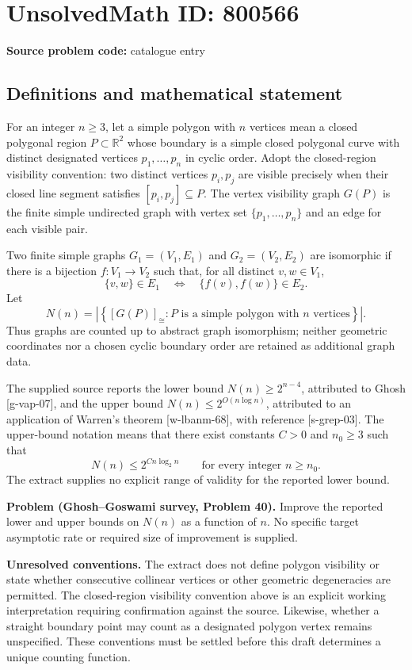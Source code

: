 \documentclass[11pt]{article}
\newcommand{\R}{\mathbb{R}}
\begin{document}
\section*{UnsolvedMath ID: 800566}
\textbf{Source problem code:} catalogue entry
\subsection{Definitions and mathematical statement}
For an integer \(n\geq 3\), let a simple polygon with \(n\) vertices mean a closed polygonal region \(P\subset\R^2\) whose boundary is a simple closed polygonal curve with distinct designated vertices \(p_1,\ldots,p_n\) in cyclic order. Adopt the closed-region visibility convention: two distinct vertices \(p_i,p_j\) are visible precisely when their closed line segment satisfies \([p_i,p_j]\subseteq P\). The vertex visibility graph \(G(P)\) is the finite simple undirected graph with vertex set \(\{p_1,\ldots,p_n\}\) and an edge for each visible pair.

Two finite simple graphs \(G_1=(V_1,E_1)\) and \(G_2=(V_2,E_2)\) are isomorphic if there is a bijection \(f:V_1\to V_2\) such that, for all distinct \(v,w\in V_1\),
\[
\{v,w\}\in E_1\quad\Longleftrightarrow\quad\{f(v),f(w)\}\in E_2.
\]
Let
\[
N(n)=\left|\left\{[G(P)]_{\cong}:P\text{ is a simple polygon with }n\text{ vertices}\right\}\right|.
\]
Thus graphs are counted up to abstract graph isomorphism; neither geometric coordinates nor a chosen cyclic boundary order are retained as additional graph data.

The supplied source reports the lower bound \(N(n)\geq 2^{n-4}\), attributed to Ghosh [g-vap-07], and the upper bound \(N(n)\leq 2^{O(n\log n)}\), attributed to an application of Warren's theorem [w-lbanm-68], with reference [s-grep-03]. The upper-bound notation means that there exist constants \(C>0\) and \(n_0\geq 3\) such that
\[
N(n)\leq 2^{C n\log_2 n}\qquad\text{for every integer }n\geq n_0.
\]
The extract supplies no explicit range of validity for the reported lower bound.

\textbf{Problem (Ghosh--Goswami survey, Problem 40).} Improve the reported lower and upper bounds on \(N(n)\) as a function of \(n\). No specific target asymptotic rate or required size of improvement is supplied.

\textbf{Unresolved conventions.} The extract does not define polygon visibility or state whether consecutive collinear vertices or other geometric degeneracies are permitted. The closed-region visibility convention above is an explicit working interpretation requiring confirmation against the source. Likewise, whether a straight boundary point may count as a designated polygon vertex remains unspecified. These conventions must be settled before this draft determines a unique counting function.
\end{document}
